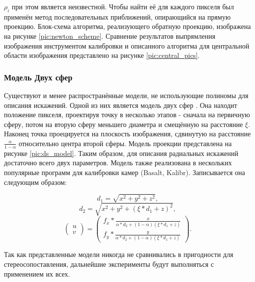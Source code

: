 $\rho_i$ при этом является неизвестной. Чтобы найти её для каждого пикселя был применён метод последовательных приближений, опирающийся на прямую проекцию.
 Блок-схема алгоритма, реализующего обратную проекцию, изображена  на рисунке  \ref{pic:newton_scheme}.  Сравнение результатов выпрямления изображения инструментом  
калибровки и описанного алгоритма для центральной области изображения представлено на рисунке \ref{pic:central_pics}. 



\subsubsection{Модель Двух сфер}  %

Существуют и менее распространённые модели, не использующие полиномы для описания искажений. Одной из них является
модель двух сфер \cite{double_sphere}. 
Она находит положение пикселя, проектируя точку в несколько этапов - сначала на первичную сферу, потом на вторую 
сферу меньшего диаметра и смещённую на расстояние $\xi$. Наконец точка проецируется на  плоскость изображения,
 сдвинутую на расстояние $\frac{\alpha}{1-\alpha}$ относительно центра второй сферы. Модель проекции представлена 
на рисунке \ref{pic:ds_model}. Таким образом, для описания радиальных искажений достаточно всего двух параметров.
 Модель также реализована в нескольких популярные программ для калибровки камер (Basalt, Kalibr). 
 Записывается она следующим образом:
\begin{eqseries}
    \begin{equation}	
        d_1 = \sqrt{x^2+y^2+z^2}, 
    \end{equation}
    \begin{equation}	
        d_2 = \sqrt{x^2+y^2+(\xi*d_1+z)^2 }, 
    \end{equation}
    \begin{equation}	
        \begin{pmatrix}u\\v\end{pmatrix} = \begin{pmatrix}f_x * \frac{x}{\alpha*d_2+(1-\alpha)(\xi*d_1+z)} \\
                                                    f_y * \frac{y}{\alpha*d_2+(1-\alpha)(\xi*d_1+z)} \end{pmatrix}.
        \label{eqn:ds}
    \end{equation}
\end{eqseries}

Так как представленные модели никогда не сравнивались в пригодности для стереосопоставления, дальнейшие
эксперименты будут выполняться с применением их всех.

\vspace{\baselineskip}